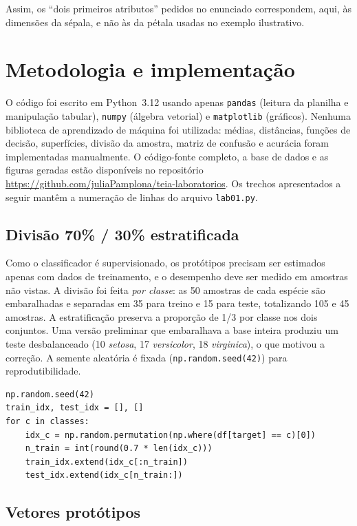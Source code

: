 \documentclass[12pt,a4paper]{article}
\newcommand{\repositorio}{\url{https://github.com/juliaPamplona/teia-laboratorios}}
\begin{document}
Assim, os ``dois primeiros atributos'' pedidos no enunciado correspondem, aqui, às dimensões da sépala, e não às da pétala usadas no exemplo ilustrativo.

\section{Metodologia e implementação}

O código foi escrito em Python~3.12 usando apenas \texttt{pandas} (leitura da planilha e manipulação tabular), \texttt{numpy} (álgebra vetorial) e \texttt{matplotlib} (gráficos). Nenhuma biblioteca de aprendizado de máquina foi utilizada: médias, distâncias, funções de decisão, superfícies, divisão da amostra, matriz de confusão e acurácia foram implementadas manualmente. O código-fonte completo, a base de dados e as figuras geradas estão disponíveis no repositório \repositorio. Os trechos apresentados a seguir mantêm a numeração de linhas do arquivo \texttt{lab01.py}.

\subsection{Divisão 70\% / 30\% estratificada}

Como o classificador é supervisionado, os protótipos precisam ser estimados apenas com dados de treinamento, e o desempenho deve ser medido em amostras não vistas. A divisão foi feita \emph{por classe}: as 50 amostras de cada espécie são embaralhadas e separadas em 35 para treino e 15 para teste, totalizando 105 e 45 amostras. A estratificação preserva a proporção de 1/3 por classe nos dois conjuntos. Uma versão preliminar que embaralhava a base inteira produziu um teste desbalanceado (10 \emph{setosa}, 17 \emph{versicolor}, 18 \emph{virginica}), o que motivou a correção. A semente aleatória é fixada (\texttt{np.random.seed(42)}) para reprodutibilidade.

\begin{lstlisting}[firstnumber=16]
np.random.seed(42)
train_idx, test_idx = [], []
for c in classes:
    idx_c = np.random.permutation(np.where(df[target] == c)[0])
    n_train = int(round(0.7 * len(idx_c)))
    train_idx.extend(idx_c[:n_train])
    test_idx.extend(idx_c[n_train:])
\end{lstlisting}

\subsection{Vetores protótipos}
\end{document}
